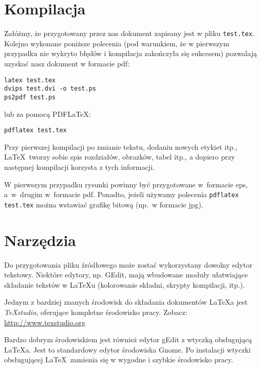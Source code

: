 
\section{Kompilacja}\label{sec:kompilacja}


Załóżmy, że przygotowany przez nas dokument zapisany jest w pliku \texttt{test.tex}. Kolejno wykonane poniższe polecenia (pod warunkiem, że w pierwszym przypadku nie wykryto błędów i kompilacja zakończyła się sukcesem) pozwalają uzyskać nasz dokument w formacie pdf:
\begin{lstlisting}
latex test.tex
dvips test.dvi -o test.ps
ps2pdf test.ps
\end{lstlisting}
%
lub za pomocą PDF\LaTeX\@:
\begin{lstlisting}
pdflatex test.tex
\end{lstlisting}

Przy pierwszej kompilacji po zmianie tekstu, dodaniu nowych etykiet itp., \LaTeX\ tworzy sobie spis rozdziałów, obrazków, tabel itp., a dopiero przy następnej kompilacji korzysta z tych informacji.

W pierwszym przypadku rysunki powinny być przygotowane w~formacie eps, a~w~drugim w~formacie pdf. Ponadto, jeżeli używamy polecenia \texttt{pdflatex test.tex} można wstawiać grafikę bitową (np.\ w formacie jpg).




\section{Narzędzia}\label{sec:narzedzia}


Do przygotowania pliku źródłowego może zostać wykorzystany dowolny edytor tekstowy. Niektóre edytory, np. GEdit, mają wbudowane moduły ułatwiające składanie tekstów w LaTeXu (kolorowanie składni, skrypty kompilacji, itp.).

Jednym z bardziej znanych środowisk do składania dokumentów  \LaTeX a jest {\em TeXstudio}, oferujące kompletne środowisko pracy. Zobacz: \url{http://www.texstudio.org} %


Bardzo dobrym środowiskiem jest również edytor gEdit z wtyczką obsługującą \LaTeX a. Jest to standardowy edytor środowiska Gnome. Po instalacji wtyczki obsługującej \LaTeX\ zamienia się w wygodne i szybkie środowisko pracy. %

